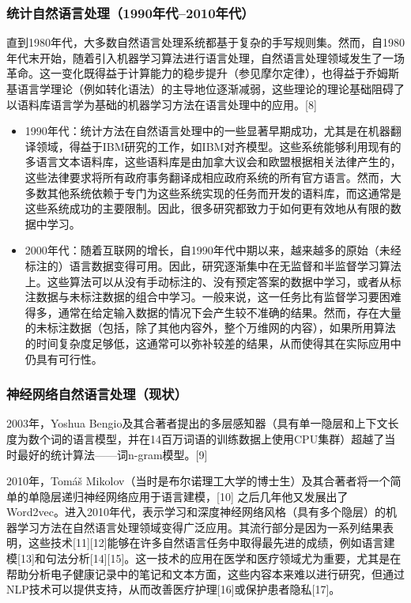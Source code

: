 \subsubsection{统计自然语言处理（1990年代–2010年代）}  
直到1980年代，大多数自然语言处理系统都基于复杂的手写规则集。然而，自1980年代末开始，随着引入机器学习算法进行语言处理，自然语言处理领域发生了一场革命。这一变化既得益于计算能力的稳步提升（参见摩尔定律），也得益于乔姆斯基语言学理论（例如转化语法）的主导地位逐渐减弱，这些理论的理论基础阻碍了以语料库语言学为基础的机器学习方法在语言处理中的应用。[8]
\begin{itemize}
\item 1990年代：统计方法在自然语言处理中的一些显著早期成功，尤其是在机器翻译领域，得益于IBM研究的工作，如IBM对齐模型。这些系统能够利用现有的多语言文本语料库，这些语料库是由加拿大议会和欧盟根据相关法律产生的，这些法律要求将所有政府事务翻译成相应政府系统的所有官方语言。然而，大多数其他系统依赖于专门为这些系统实现的任务而开发的语料库，而这通常是这些系统成功的主要限制。因此，很多研究都致力于如何更有效地从有限的数据中学习。
\item 2000年代：随着互联网的增长，自1990年代中期以来，越来越多的原始（未经标注的）语言数据变得可用。因此，研究逐渐集中在无监督和半监督学习算法上。这些算法可以从没有手动标注的、没有预定答案的数据中学习，或者从标注数据与未标注数据的组合中学习。一般来说，这一任务比有监督学习要困难得多，通常在给定输入数据的情况下会产生较不准确的结果。然而，存在大量的未标注数据（包括，除了其他内容外，整个万维网的内容），如果所用算法的时间复杂度足够低，这通常可以弥补较差的结果，从而使得其在实际应用中仍具有可行性。
\end{itemize}
\subsubsection{神经网络自然语言处理（现状）}  
2003年，Yoshua Bengio及其合著者提出的多层感知器（具有单一隐层和上下文长度为数个词的语言模型，并在14百万词语的训练数据上使用CPU集群）超越了当时最好的统计算法——词n-gram模型。[9]

2010年，Tomáš Mikolov（当时是布尔诺理工大学的博士生）及其合著者将一个简单的单隐层递归神经网络应用于语言建模，[10] 之后几年他又发展出了Word2vec。进入2010年代，表示学习和深度神经网络风格（具有多个隐层）的机器学习方法在自然语言处理领域变得广泛应用。其流行部分是因为一系列结果表明，这些技术[11][12]能够在许多自然语言任务中取得最先进的成绩，例如语言建模[13]和句法分析[14][15]。这一技术的应用在医学和医疗领域尤为重要，尤其是在帮助分析电子健康记录中的笔记和文本方面，这些内容本来难以进行研究，但通过NLP技术可以提供支持，从而改善医疗护理[16]或保护患者隐私[17]。
